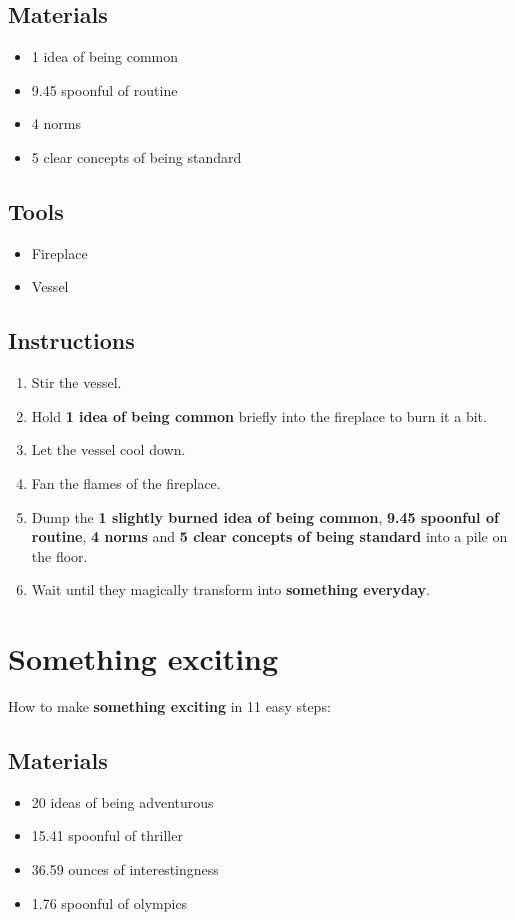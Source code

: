 \documentclass{article}
\begin{document}
\subsection{Materials}\begin{itemize}
\item 
1 idea of being common
\item 
9.45 spoonful of routine
\item 
4 norms
\item 
5 clear concepts of being standard
\end{itemize}
\subsection{Tools}\begin{itemize}
\item 
Fireplace
\item 
Vessel
\end{itemize}
\subsection{Instructions}\begin{enumerate}
\item 
Stir the vessel.
\item 
Hold \textbf{1 idea of being common} briefly into the fireplace to burn it a bit.
\item 
Let the vessel cool down.
\item 
Fan the flames of the fireplace.
\item 
Dump the \textbf{1 slightly burned idea of being common}, \textbf{9.45 spoonful of routine}, \textbf{4 norms} and \textbf{5 clear concepts of being standard} into a pile on the floor.
\item 
Wait until they magically transform into \textbf{something everyday}.
\end{enumerate}
\newpage
\section{Something exciting}How to make \textbf{something exciting} in 11 easy steps:

\subsection{Materials}\begin{itemize}
\item 
20 ideas of being adventurous
\item 
15.41 spoonful of thriller
\item 
36.59 ounces of interestingness
\item 
1.76 spoonful of olympics
\end{itemize}
\end{document}
